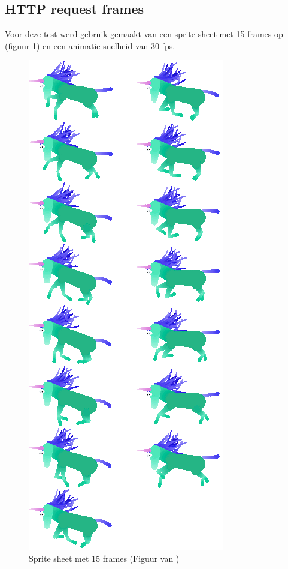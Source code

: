 \subsection{HTTP request frames}

Voor deze test werd gebruik gemaakt van een sprite sheet met 15 frames op (figuur \ref{sheet}) en een animatie snelheid van 30 fps.

\begin{figure} [H]
	\centering
	\includegraphics [scale=0.6] {img/charging.png}
	\caption{Sprite sheet met 15 frames (Figuur van \cite{stackoverflow})} \label{sheet}
\end{figure}

